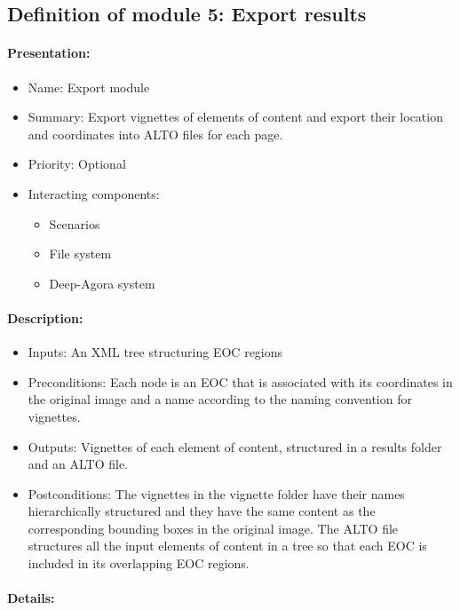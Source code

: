 \documentclass{polytech/polytech}
\numberwithin{figure}{chapter}
\begin{document}
\begin{appendix}
\subsection{Definition of module 5: Export results}

\paragraph{Presentation:}
 
\begin{itemize}
    \item Name: Export module
    \item Summary: Export vignettes of elements of content and export their location and coordinates into ALTO files for each page.
    \item Priority: Optional
    \item Interacting components:
    \begin{itemize}
        \item Scenarios
        \item File system
        \item Deep-Agora system
    \end{itemize}
\end{itemize}

\paragraph{Description:}
 
\begin{itemize}
    \item Inputs: An XML tree structuring EOC regions
    \item Preconditions: Each node is an EOC that is associated with its coordinates in the original image and a name according to the naming convention for vignettes.
    \item Outputs: Vignettes of each element of content, structured in a results folder and an ALTO file.
    \item Postconditions: The vignettes in the vignette folder have their names hierarchically structured and they have the same content as the corresponding bounding boxes in the original image.
The ALTO file structures all the input elements of content in a tree so that each EOC is included in its overlapping EOC regions.
\end{itemize}

\paragraph{Details:}


\end{appendix}
\end{document}
